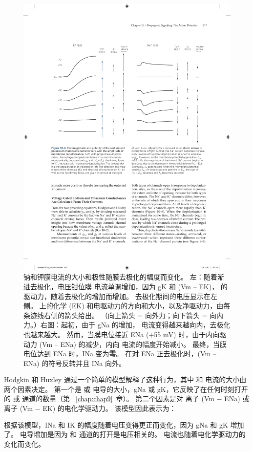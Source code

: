 \begin{figure}[htbp]
	\centering
	\includegraphics[width=0.8\linewidth]{chap10/fig_10_4}
	\caption{钠和钾膜电流的大小和极性随膜去极化的幅度而变化。
		左：随着渐进去极化，电压钳位膜  电流单调增加，因为 gK 和 (Vm – EK)， 的驱动力，随着去极化的增加而增加。
		去极化期间的电压显示在左侧。
		 上的化学 (EK) 和电驱动力的方向和大小，以及净驱动力，由每条迹线右侧的箭头给出。
		（向上箭头 = 向外力；向下箭头 = 向内力。）右图：起初，由于 gNa 的增加， 电流变得越来越向内，去极化也越来越大。
		然而，当膜电位接近 ENa (+55 mV) 时，由于内向驱动力 (Vm – ENa) 的减少，内向  电流的幅度开始减小。
		最终，当膜电位达到 ENa 时，INa 变为零。
		在对 ENa 正去极化时，(Vm – ENa) 的符号反转并且 INa 向外。}
	\label{fig:10_4}
\end{figure}


Hodgkin 和 Huxley 通过一个简单的模型解释了这种行为，其中  和  电流的大小由两个因素决定。
第一个是  或  电导的大小，gNa 或 gK，它反映了在任何时刻打开的  或  通道的数量（第 ~\ref{chap:chap9}~章）。
第二个因素是对  离子 (Vm − ENa) 或  离子 (Vm − EK) 的电化学驱动力。
该模型因此表示为：


根据该模型，INa 和 IK 的幅度随着电压变得更正而变化，因为 gNa 和 gK 增加了。
电导增加是因为  和  通道的打开是电压相关的。
电流也随着电化学驱动力的变化而变化。


